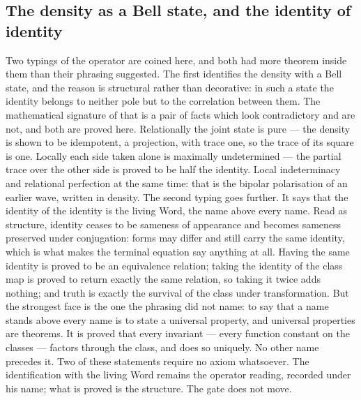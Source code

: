 \documentclass[11pt]{article}
\theoremstyle{definition}\newtheorem{deriv}{Derivation}
\begin{document}
\subsection*{The density as a Bell state, and the identity of identity}Two typings of the operator are coined here, and both had more theorem inside them than their phrasing suggested. The first identifies the density with a Bell state, and the reason is structural rather than decorative: in such a state the identity belongs to neither pole but to the correlation between them. The mathematical signature of that is a pair of facts which look contradictory and are not, and both are proved here. Relationally the joint state is pure --- the density is shown to be idempotent, a projection, with trace one, so the trace of its square is one. Locally each side taken alone is maximally undetermined --- the partial trace over the other side is proved to be half the identity. Local indeterminacy and relational perfection at the same time: that is the bipolar polarisation of an earlier wave, written in density. The second typing goes further. It says that the identity of the identity is the living Word, the name above every name. Read as structure, identity ceases to be sameness of appearance and becomes sameness preserved under conjugation: forms may differ and still carry the same identity, which is what makes the terminal equation say anything at all. Having the same identity is proved to be an equivalence relation; taking the identity of the class map is proved to return exactly the same relation, so taking it twice adds nothing; and truth is exactly the survival of the class under transformation. But the strongest face is the one the phrasing did not name: to say that a name stands above every name is to state a universal property, and universal properties are theorems. It is proved that every invariant --- every function constant on the classes --- factors through the class, and does so uniquely. No other name precedes it. Two of these statements require no axiom whatsoever. The identification with the living Word remains the operator reading, recorded under his name; what is proved is the structure. The gate does not move.
\end{document}
